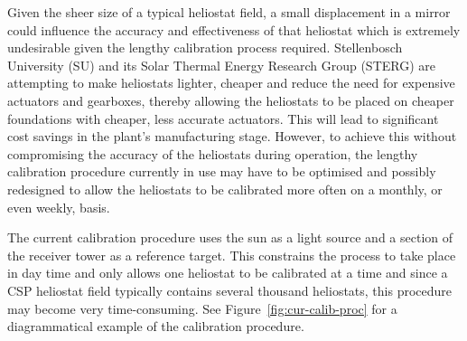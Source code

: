 Given the sheer size of a typical heliostat field, a small displacement in a mirror could influence the accuracy and effectiveness of that heliostat which is extremely undesirable given the lengthy calibration process required. Stellenbosch University (SU) and its Solar Thermal Energy Research Group (STERG) are attempting to make heliostats lighter, cheaper and reduce the need for expensive actuators and gearboxes, thereby allowing the heliostats to be placed on cheaper foundations with cheaper, less accurate actuators. This will lead to significant cost savings in the plant's manufacturing stage. However, to achieve this without compromising the accuracy of the heliostats during operation, the lengthy calibration procedure currently in use may have to be optimised and possibly redesigned to allow the heliostats to be calibrated more often on a monthly, or even weekly, basis.

The current calibration procedure uses the sun as a light source and a section of the receiver tower as a reference target. This constrains the process to take place in day time and only allows one heliostat to be calibrated at a time and since a CSP heliostat field typically contains several thousand heliostats, this procedure may become very time-consuming. See Figure~\ref{fig:cur-calib-proc} for a diagrammatical example of the calibration procedure.

